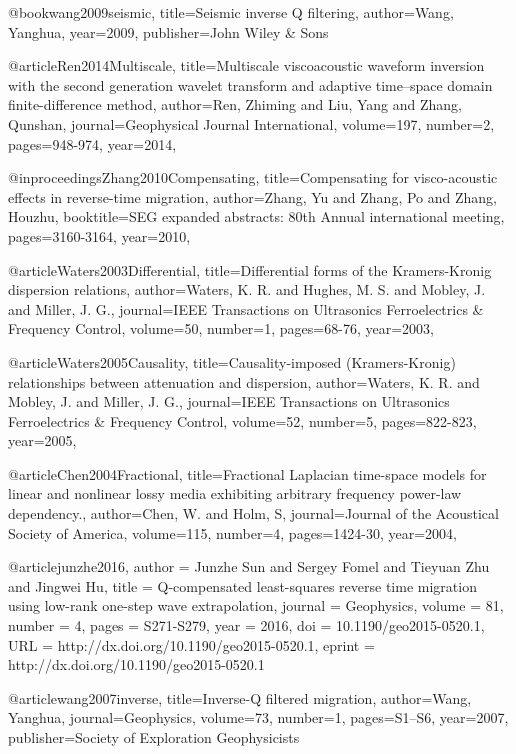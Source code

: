 {@book{wang2009seismic,
  title={Seismic inverse {Q} filtering},
  author={Wang, Yanghua},
  year={2009},
  publisher={John Wiley \& Sons}
}

@article{Ren2014Multiscale,
  title={Multiscale viscoacoustic waveform inversion with the second generation wavelet transform and adaptive time–space domain finite-difference method},
  author={Ren, Zhiming and Liu, Yang and Zhang, Qunshan},
  journal={Geophysical Journal International},
  volume={197},
  number={2},
  pages={948-974},
  year={2014},
}

@inproceedings{Zhang2010Compensating,
  title={Compensating for visco-acoustic effects in reverse-time migration},
  author={Zhang, Yu and Zhang, Po and Zhang, Houzhu},
  booktitle={SEG expanded abstracts: 80th Annual international meeting},
  pages={3160-3164},
  year={2010},
}

@article{Waters2003Differential,
  title={Differential forms of the Kramers-Kronig dispersion relations},
  author={Waters, K. R. and Hughes, M. S. and Mobley, J. and Miller, J. G.},
  journal={IEEE Transactions on Ultrasonics Ferroelectrics \& Frequency Control},
  volume={50},
  number={1},
  pages={68-76},
  year={2003},
}

@article{Waters2005Causality,
  title={Causality-imposed (Kramers-Kronig) relationships between attenuation and dispersion},
  author={Waters, K. R. and Mobley, J. and Miller, J. G.},
  journal={IEEE Transactions on Ultrasonics Ferroelectrics \& Frequency Control},
  volume={52},
  number={5},
  pages={822-823},
  year={2005},
}

@article{Chen2004Fractional,
  title={Fractional Laplacian time-space models for linear and nonlinear lossy media exhibiting arbitrary frequency power-law dependency.},
  author={Chen, W. and Holm, S},
  journal={Journal of the Acoustical Society of America},
  volume={115},
  number={4},
  pages={1424-30},
  year={2004},
}

@article{junzhe2016,
author = {Junzhe Sun and Sergey Fomel and Tieyuan Zhu and Jingwei Hu},
title = {Q-compensated least-squares reverse time migration using low-rank one-step wave extrapolation},
journal = {Geophysics},
volume = {81},
number = {4},
pages = {S271-S279},
year = {2016},
doi = {10.1190/geo2015-0520.1},
URL = {http://dx.doi.org/10.1190/geo2015-0520.1},
eprint = {http://dx.doi.org/10.1190/geo2015-0520.1}
}

@article{wang2007inverse,
  title={Inverse-{Q} filtered migration},
  author={Wang, Yanghua},
  journal={Geophysics},
  volume={73},
  number={1},
  pages={S1--S6},
  year={2007},
  publisher={Society of Exploration Geophysicists}
}

}
